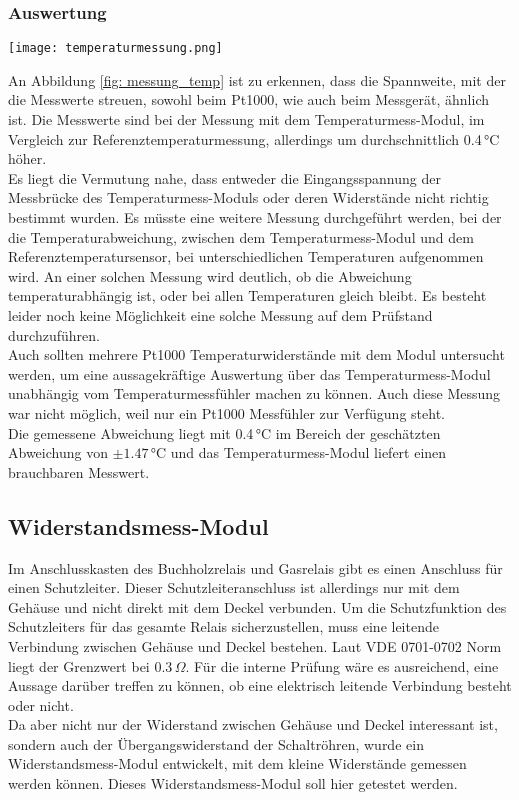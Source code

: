 \subsubsection{Auswertung}
\begin{figure*}[h]
	\centering
	\texttt{[image: temperaturmessung.png]}
	\caption{Messwertdarstellung zur Untersuchung der Temperaturmessung\\
	(blau: Pt1000, rot: Referenztemperatur)}
	\label{fig: messung_temp}
\end{figure*}

\noindent
An Abbildung \ref{fig: messung_temp} ist zu erkennen, dass die Spannweite, mit der die Messwerte streuen, sowohl beim Pt1000, wie auch beim Messgerät, ähnlich ist. Die Messwerte sind bei der Messung mit dem Temperaturmess-Modul, im Vergleich zur Referenztemperaturmessung, allerdings um durchschnittlich 0.4\,°C höher.
\\
Es liegt die Vermutung nahe, dass entweder die Eingangsspannung der Messbrücke des Temperaturmess-Moduls oder deren Widerstände nicht richtig bestimmt wurden. Es müsste eine weitere Messung durchgeführt werden, bei der die Temperaturabweichung, zwischen dem Temperaturmess-Modul und dem Referenztemperatursensor, bei unterschiedlichen Temperaturen aufgenommen wird. An einer solchen Messung wird deutlich, ob die Abweichung temperaturabhängig ist, oder bei allen Temperaturen gleich bleibt. Es besteht leider noch keine Möglichkeit eine solche Messung auf dem Prüfstand durchzuführen.
\\
Auch sollten mehrere Pt1000 Temperaturwiderstände mit dem Modul untersucht werden, um eine aussagekräftige Auswertung über das Temperaturmess-Modul unabhängig vom Temperaturmessfühler machen zu können. Auch diese Messung war nicht möglich, weil nur ein Pt1000 Messfühler zur Verfügung steht.
\\
Die gemessene Abweichung liegt mit 0.4\,°C im Bereich der geschätzten Abweichung von \(\pm 1.47\)\,°C und das Temperaturmess-Modul liefert einen brauchbaren Messwert.

\newpage
\subsection{Widerstandsmess-Modul}
Im Anschlusskasten des Buchholzrelais und Gasrelais gibt es einen Anschluss für einen Schutzleiter. Dieser Schutzleiteranschluss ist allerdings nur mit dem Gehäuse und nicht direkt mit dem Deckel verbunden. Um die Schutzfunktion des Schutzleiters für das gesamte Relais sicherzustellen, muss eine leitende Verbindung zwischen Gehäuse und Deckel bestehen. Laut VDE 0701-0702 Norm liegt der Grenzwert bei 0.3\,\(\Omega\). Für die interne Prüfung wäre es ausreichend, eine Aussage darüber treffen zu können, ob eine elektrisch leitende Verbindung besteht oder nicht.
\\
Da aber nicht nur der Widerstand zwischen Gehäuse und Deckel interessant ist, sondern auch der Übergangswiderstand der Schaltröhren, wurde ein Widerstandsmess-Modul entwickelt, mit dem kleine Widerstände gemessen werden können. Dieses Widerstandsmess-Modul soll hier getestet werden.

